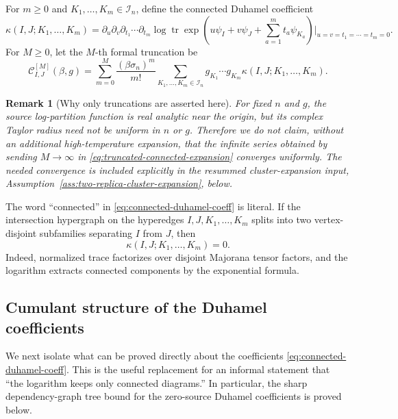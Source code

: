 \documentclass[11pt]{article}
\newtheorem{remark}[theorem]{Remark}
\newcommand{\tr}{\operatorname{tr}}
\newcommand{\calI}{\mathcal{I}}
\begin{document}
For $m\geq0$ and $K_1,\ldots,K_m\in\calI_n$, define the connected Duhamel
coefficient
\begin{equation}\label{eq:connected-duhamel-coeff}
  \kappa(I,J;K_1,
  \ldots,K_m)
  =
  \partial_u\partial_v\partial_{t_1}\cdots\partial_{t_m}
  \log\tr\exp\left(
    u\psi_I+v\psi_J+
    \sum_{a=1}^m t_a\psi_{K_a}
  \right)\bigg|_{u=v=t_1=\cdots=t_m=0}.
\end{equation}
For $M\geq0$, let the $M$-th formal truncation be
\begin{equation}\label{eq:truncated-connected-expansion}
  \mathcal C^{[M]}_{I,J}(\beta,g)
  =
  \sum_{m=0}^M
  \frac{(\beta\sigma_n)^m}{m!}
  \sum_{K_1,
  \ldots,K_m\in\calI_n}
  g_{K_1}\cdots g_{K_m}
  \kappa(I,J;K_1,
  \ldots,K_m).
\end{equation}

\begin{remark}[Why only truncations are asserted here]
  For fixed $n$ and $g$, the source log-partition function is real analytic near
  the origin, but its complex Taylor radius need not be uniform in $n$ or $g$.
  Therefore we do not claim, without an additional high-temperature expansion,
  that the infinite series obtained by sending $M\to\infty$ in
  \eqref{eq:truncated-connected-expansion} converges uniformly.  The needed
  convergence is included explicitly in the resummed cluster-expansion input,
  Assumption~\ref{ass:two-replica-cluster-expansion}, below.
\end{remark}

The word ``connected'' in \eqref{eq:connected-duhamel-coeff} is literal.  If the
intersection hypergraph on the hyperedges $I,J,K_1,\ldots,K_m$ splits into two
vertex-disjoint subfamilies separating $I$ from $J$, then
\begin{equation}\label{eq:connected-vanishing}
  \kappa(I,J;K_1,
  \ldots,K_m)=0.
\end{equation}
Indeed, normalized trace factorizes over disjoint Majorana tensor factors, and
the logarithm extracts connected components by the exponential formula.

\subsection{Cumulant structure of the Duhamel coefficients}
\label{subsec:duhamel-cumulant-structure}

We next isolate what can be proved directly about the coefficients
\eqref{eq:connected-duhamel-coeff}.  This is the useful replacement for an
informal statement that ``the logarithm keeps only connected diagrams.''  In
particular, the sharp dependency-graph tree bound for the zero-source
Duhamel coefficients is proved below.
\end{document}
